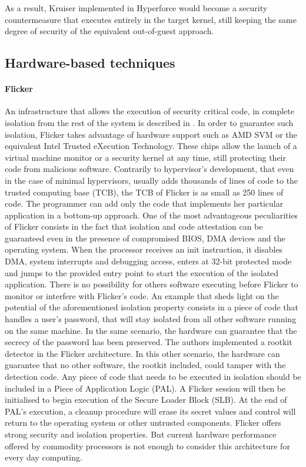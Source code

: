 As a result, Kruiser implemented in Hyperforce would become a security countermeasure that executes entirely in the target kernel, still keeping the same degree of security of the equivalent out-of-guest approach.


\subsection{Hardware-based techniques} \label{hwbased}
\paragraph{Flicker}
An infrastructure that allows the execution of security critical code, in complete isolation from the rest of the system is described in \cite{flicker}. In order to guarantee such isolation, Flicker takes advantage of hardware support such as AMD SVM or the equivalent Intel Trusted eXecution Technology. These chips allow the launch of a virtual machine monitor or a security kernel at any time, still protecting their code from malicious software.
Contrarily to hypervisor's development, that even in the case of minimal hypervisors, usually adds thousands of lines of code to the trusted computing base (TCB), the TCB of Flicker is as small as 250 lines of code. The programmer can add only the code that implements her particular application in a bottom-up approach. 
One of the most advantageous peculiarities of Flicker consists in the fact that isolation and code attestation can be guaranteed even in the presence of compromised BIOS, DMA devices and the operating system. 
When the processor receives an init instruction, it disables DMA, system interrupts and debugging access, enters at 32-bit protected mode and jumps to the provided entry point to start the execution of the isolated application.
There is no possibility for others software executing before Flicker to monitor or interfere with Flicker's code.
An example that sheds light on the potential of the aforementioned isolation property consists in a piece of code that handles a user's password, that will stay isolated from all other software running on the same machine. In the same scenario, the hardware can guarantee that the secrecy of the password has been preserved.  
The authors implemented a rootkit detector in the Flicker architecture. In this other scenario, the hardware can guarantee that no other software, the rootkit included, could tamper with the detection code. 
Any piece of code that needs to be executed in isolation should be included in a Piece of Application Logic (PAL). A Flicker session will then be initialised to begin execution of the Secure Loader Block (SLB). At the end of PAL's execution, a cleanup procedure will erase its secret values and control will return to the operating system or other untrusted components. 
Flicker offers strong security and isolation properties. But current hardware performance offered by commodity processors is not enough to consider this architecture for every day computing. 



